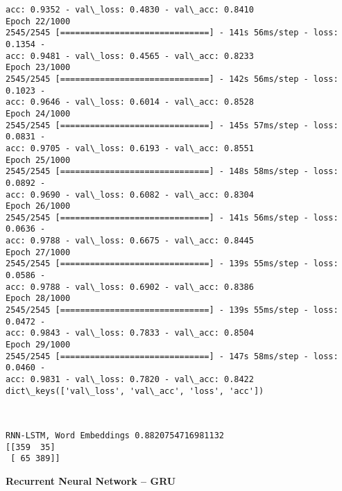 \documentclass[11pt]{article}
\begin{document}
\begin{Verbatim}[commandchars=\\\{\}]
acc: 0.9352 - val\_loss: 0.4830 - val\_acc: 0.8410
Epoch 22/1000
2545/2545 [==============================] - 141s 56ms/step - loss: 0.1354 -
acc: 0.9481 - val\_loss: 0.4565 - val\_acc: 0.8233
Epoch 23/1000
2545/2545 [==============================] - 142s 56ms/step - loss: 0.1023 -
acc: 0.9646 - val\_loss: 0.6014 - val\_acc: 0.8528
Epoch 24/1000
2545/2545 [==============================] - 145s 57ms/step - loss: 0.0831 -
acc: 0.9705 - val\_loss: 0.6193 - val\_acc: 0.8551
Epoch 25/1000
2545/2545 [==============================] - 148s 58ms/step - loss: 0.0892 -
acc: 0.9690 - val\_loss: 0.6082 - val\_acc: 0.8304
Epoch 26/1000
2545/2545 [==============================] - 141s 56ms/step - loss: 0.0636 -
acc: 0.9788 - val\_loss: 0.6675 - val\_acc: 0.8445
Epoch 27/1000
2545/2545 [==============================] - 139s 55ms/step - loss: 0.0586 -
acc: 0.9788 - val\_loss: 0.6902 - val\_acc: 0.8386
Epoch 28/1000
2545/2545 [==============================] - 139s 55ms/step - loss: 0.0472 -
acc: 0.9843 - val\_loss: 0.7833 - val\_acc: 0.8504
Epoch 29/1000
2545/2545 [==============================] - 147s 58ms/step - loss: 0.0460 -
acc: 0.9831 - val\_loss: 0.7820 - val\_acc: 0.8422
dict\_keys(['val\_loss', 'val\_acc', 'loss', 'acc'])
\end{Verbatim}

    \begin{center}
    \end{center}
    { \hspace*{\fill} \\}
    
    \begin{Verbatim}[commandchars=\\\{\}]
RNN-LSTM, Word Embeddings 0.8820754716981132
[[359  35]
 [ 65 389]]
\end{Verbatim}

    \textbf{Recurrent Neural Network -- GRU}
\end{document}
